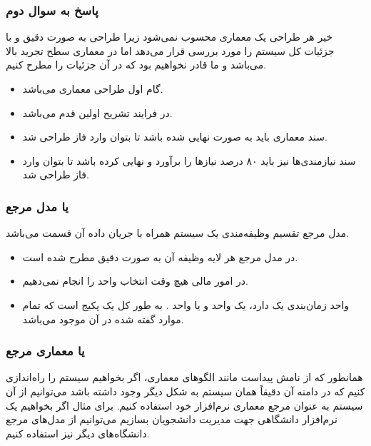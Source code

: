 \subsubsection*{پاسخ به سوال دوم}

خیر هر طراحی یک معماری محسوب نمی‌شود زیرا طراحی به صورت دقیق و با جزئیات کل
سیستم را مورد بررسی قرار می‌دهد اما در معماری سطح تجرید بالا می‌باشد و ما قادر
نخواهیم بود که در آن جزئیات را مطرح کنیم.

\begin{itemize}
    \item گام اول طراحی معماری می‌باشد.
    \item در  فرایند تشریح اولین قدم می‌باشد.
    \item سند معماری باید به صورت نهایی شده باشد تا بتوان وارد فاز طراحی شد.
    \item سند نیازمندی‌ها نیز باید ۸۰ درصد نیاز‌ها را برآورد و نهایی کرده باشد
    تا بتوان وارد فاز طراحی شد.
\end{itemize}

\subsubsection{ یا مدل مرجع}

مدل مرجع تقسیم وظیفه‌مندی یک سیستم همراه با جریان داده آن قسمت می‌باشد.

\begin{itemize}
    \item در مدل مرجع  هر لایه وظیفه آن به صورت دقیق مطرح شده است.
    \item در امور مالی هیچ وقت انتخاب واحد را انجام نمی‌دهیم.
    \item واحد زمان‌بندی یک  دارد، یک واحد  و یا واحد
    . به طور کل یک پکیج است که تمام موارد گفته شده در آن موجود
    می‌باشد.
\end{itemize}

\subsubsection{ یا معماری مرجع}

همانطور که از نامش پیداست مانند الگو‌های معماری، اگر بخواهیم سیستم را راه‌اندازی
کنیم که در دامنه آن دقیقاً همان سیستم به شکل دیگر وجود داشته باشد می‌توانیم از
آن سیستم به عنوان مرجع معماری نرم‌افزار خود استفاده کنیم. برای مثال اگر بخواهیم
یک نرم‌افزار دانشگاهی جهت مدیریت دانشجویان بسازیم می‌توانیم از مدل‌های مرجع
دانشگاه‌های دیگر نیز استفاده کنیم.


